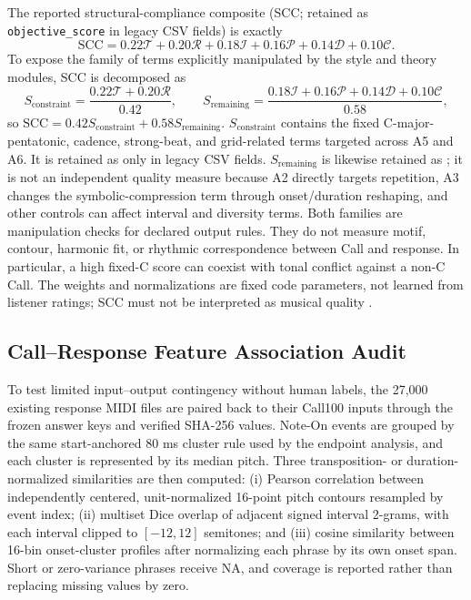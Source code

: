 \documentclass[11pt,a4paper]{article}
\begin{document}
The reported structural-compliance composite (SCC; retained as \texttt{objective\_score} in legacy CSV fields) is exactly
\begin{equation}
\mathrm{SCC}=0.22\mathcal T+0.20\mathcal R+0.18\mathcal I+0.16\mathcal P+0.14\mathcal D+0.10\mathcal C.
\label{eq:scc}
\end{equation}
To expose the family of terms explicitly manipulated by the style and theory modules, SCC is decomposed as
\begin{equation}
S_{\mathrm{constraint}}=\frac{0.22\mathcal T+0.20\mathcal R}{0.42},\qquad
S_{\mathrm{remaining}}=\frac{0.18\mathcal I+0.16\mathcal P+0.14\mathcal D+0.10\mathcal C}{0.58},
\end{equation}
so $\mathrm{SCC}=0.42S_{\mathrm{constraint}}+0.58S_{\mathrm{remaining}}$. $S_{\mathrm{constraint}}$ contains the fixed C-major-pentatonic, cadence, strong-beat, and grid-related terms targeted across A5 and A6. It is retained as  only in legacy CSV fields. $S_{\mathrm{remaining}}$ is likewise retained as ; it is not an independent quality measure because A2 directly targets repetition, A3 changes the symbolic-compression term through onset/duration reshaping, and other controls can affect interval and diversity terms. Both families are manipulation checks for declared output rules. They do not measure motif, contour, harmonic fit, or rhythmic correspondence between Call and response. In particular, a high fixed-C score can coexist with tonal conflict against a non-C Call. The weights and normalizations are fixed code parameters, not learned from listener ratings; SCC must not be interpreted as musical quality \citep{ji2023survey,lerch2025evaluation}.

\subsection{Call--Response Feature Association Audit}
\label{subsec:feature-association-method}

To test limited input--output contingency without human labels, the 27,000 existing response MIDI files are paired back to their Call100 inputs through the frozen answer keys and verified SHA-256 values. Note-On events are grouped by the same start-anchored 80 ms cluster rule used by the endpoint analysis, and each cluster is represented by its median pitch. Three transposition- or duration-normalized similarities are then computed: (i) Pearson correlation between independently centered, unit-normalized 16-point pitch contours resampled by event index; (ii) multiset Dice overlap of adjacent signed interval 2-grams, with each interval clipped to $[-12,12]$ semitones; and (iii) cosine similarity between 16-bin onset-cluster profiles after normalizing each phrase by its own onset span. Short or zero-variance phrases receive NA, and coverage is reported rather than replacing missing values by zero.
\end{document}
